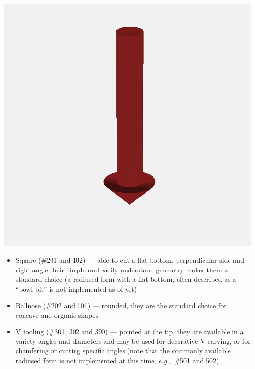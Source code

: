 \documentclass{ltxdoc}
\begin{document}
\begin{samepage}
           \includegraphics[width=\linewidth/3]{images/tool_V_301.png}%

\begin{itemize}
\item Square (\#201 and 102) --- able to cut a flat bottom, perpendicular side and right angle
                                 their simple and easily understood geometry makes them a 
                                 standard choice (a radiused form with a flat bottom, often
                                 described as a ``bowl bit'' is not implemented as-of-yet)
\item Ballnose (\#202 and 101) --- rounded, they are the standard choice for concave and 
                                   organic shapes
\item V tooling (\#301, 302 and 390) --- pointed at the tip, they are available in a variety
                                         angles and diameters and may be used for decorative
                                         V carving, or for chamfering or cutting specific angles
                                         (note that the commonly available radiused form is not
                                         implemented at this time, \emph{e.g.},~\#501 and 502)
\end{itemize}
\end{samepage}
\end{document}
